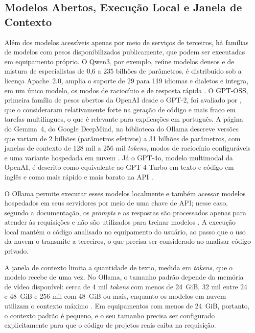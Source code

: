 \documentclass[
    12pt,                   %
    openright,              %
    oneside,                %
    a4paper,                %
    sumario=tradicional,    %
    english,                %
    brazil,                 %
    ]{abntex2}
\begin{document}
\subsection{Modelos Abertos, Execução Local e Janela de Contexto}\label{sec:modelosabertos}

Além dos modelos acessíveis apenas por meio de serviços de terceiros, há famílias de modelos com pesos disponibilizados publicamente, que podem ser executadas em equipamento próprio. O Qwen3, por exemplo, reúne modelos densos e de mistura de especialistas de 0,6 a 235 bilhões de parâmetros, é distribuído sob a licença Apache~2.0, amplia o suporte de 29 para 119 idiomas e dialetos e integra, em um único modelo, os modos de raciocínio e de resposta rápida \cite{yang2025qwen3}. O GPT-OSS, primeira família de pesos abertos da OpenAI desde o GPT-2, foi avaliado por \textcite{bi2025gptoss}, que o consideraram relativamente forte na geração de código e mais fraco em tarefas multilíngues, o que é relevante para explicações em português. A página do Gemma~4, do Google DeepMind, na biblioteca do Ollama descreve versões que variam de 2 bilhões (parâmetros efetivos) a 31 bilhões de parâmetros, com janelas de contexto de 128 mil a 256 mil \textit{tokens}, modos de raciocínio configuráveis e uma variante hospedada em nuvem \cite{ollama2026gemma4}. Já o GPT-4o, modelo multimodal da OpenAI, é descrito como equivalente ao GPT-4 Turbo em texto e código em inglês e como mais rápido e mais barato na API \cite{openai2024gpt4o}.

O Ollama permite executar esses modelos localmente e também acessar modelos hospedados em seus servidores por meio de uma chave de API; nesse caso, segundo a documentação, os \textit{prompts} e as respostas são processados apenas para atender às requisições e não são utilizados para treinar modelos \cite{ollama2026nuvem}. A execução local mantém o código analisado no equipamento do usuário, ao passo que o uso da nuvem o transmite a terceiros, o que precisa ser considerado ao analisar código privado.

A janela de contexto limita a quantidade de texto, medida em \textit{tokens}, que o modelo recebe de uma vez. No Ollama, o tamanho padrão depende da memória de vídeo disponível: cerca de 4 mil \textit{tokens} com menos de 24~GiB, 32 mil entre 24 e 48~GiB e 256 mil com 48~GiB ou mais, enquanto os modelos em nuvem utilizam o contexto máximo \cite{ollama2026contexto}. Em equipamentos com menos de 24~GiB, portanto, o contexto padrão é pequeno, e o seu tamanho precisa ser configurado explicitamente para que o código de projetos reais caiba na requisição.
\end{document}
